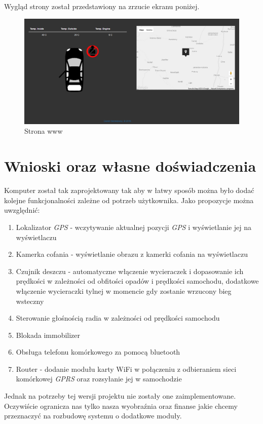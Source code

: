 \documentclass{xmgr}
\begin{document}
Wygląd strony został przedstawiony na zrzucie ekranu poniżej.
\begin{figure}[!h]
    \centering
    	\includegraphics[height=0.35\textheight]{images/www.png}
    \caption{Strona www}
\end{figure}

\section{Wnioski oraz własne doświadczenia}
Komputer został tak zaprojektowany tak aby w łatwy sposób można było dodać kolejne funkcjonalności zależne od potrzeb użytkownika. Jako propozycje można uwzględnić:
\begin{enumerate}
	\item Lokalizator \emph{GPS} - wczytywanie aktualnej pozycji \emph{GPS} i wyświetlanie jej na wyświetlaczu
	\item Kamerka cofania - wyświetlanie obrazu z kamerki cofania na wyświetlaczu
	\item Czujnik deszczu - automatyczne włączenie wycieraczek i dopasowanie ich prędkości w zależności od obfitości opadów i prędkości samochodu, dodatkowe włączenie wycieraczki tylnej w momencie gdy zostanie wrzucony bieg wsteczny
	\item Sterowanie głośnością radia w zależności od prędkości samochodu
	\item Blokada immobilizer
	\item Obsługa telefonu komórkowego za pomocą bluetooth
	\item Router - dodanie modułu karty WiFi w połączeniu z odbieraniem sieci komórkowej \emph{GPRS} oraz rozsyłanie jej w samochodzie
\end{enumerate}
Jednak na potrzeby tej wersji projektu nie zostały one zaimplementowane. Oczywiście ogranicza nas tylko nasza wyobraźnia oraz finanse jakie chcemy przeznaczyć na rozbudowę systemu o dodatkowe moduły.
\end{document}
